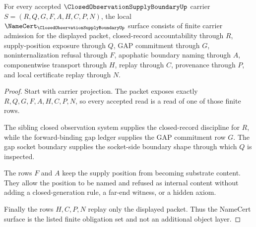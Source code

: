 \begin{theorem}
\label{thm:closed-observation-supply-boundary-namecert-obligations}
For every accepted $\ClosedObservationSupplyBoundaryUp$ carrier $S=(R,Q,G,F,A,H,C,P,N)$, the local $\NameCert_{\ClosedObservationSupplyBoundaryUp}$ surface consists of finite carrier admission for the displayed packet, closed-record accountability through $R$, supply-position exposure through $Q$, GAP commitment through $G$, noninternalization refusal through $F$, apophatic boundary naming through $A$, componentwise transport through $H$, replay through $C$, provenance through $P$, and local certificate replay through $N$.
\end{theorem}
\begin{proof}
Start with carrier projection. The packet exposes exactly $R,Q,G,F,A,H,C,P,N$, so every accepted read is a read of one of those finite rows.

The sibling closed observation system supplies the closed-record discipline for $R$, while the forward-binding gap ledger supplies the GAP commitment row $G$. The gap socket boundary supplies the socket-side boundary shape through which $Q$ is inspected.

The rows $F$ and $A$ keep the supply position from becoming substrate content. They allow the position to be named and refused as internal content without adding a closed-generation rule, a far-end witness, or a hidden axiom.

Finally the rows $H,C,P,N$ replay only the displayed packet. Thus the NameCert surface is the listed finite obligation set and not an additional object layer.
\end{proof}

